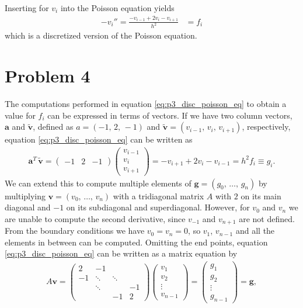 \documentclass[english,notitlepage,nofootinbib]{revtex4-1}  %
\begin{document}
Inserting for $v_i$ into the Poisson equation yields 
\begin{align}
    -v_i'' = \frac{-v_{i-1}+2v_i-v_{i+1}}{h^2} &= f_i \label{eq:p3_disc_poisson_eq} 
\end{align}
which is a discretized version of the Poisson equation. 



\section*{Problem 4}
The computations performed in equation \eqref{eq:p3_disc_poisson_eq} to obtain a value for $f_i$ can be expressed in terms of vectors. If we have two column vectors, $\mathbf{a}$ and $\mathbf{\tilde{v}}$, defined as $a=(-1,\,2,\,-1)$ and $\mathbf{\tilde{v}}=(v_{i-1},\,v_i,\,v_{i+1})$, respectively, equation \eqref{eq:p3_disc_poisson_eq} can be written as  
\begin{align*}
    \mathbf{a}^T \, \mathbf{\tilde{v}} = \begin{pmatrix}
        -1 & 2 & -1 
    \end{pmatrix}
    \begin{pmatrix}
        v_{i-1} \\ 
        v_i \\ 
        v_{i+1}
    \end{pmatrix}
    = -v_{i+1}+2v_i-v_{i-1} = h^2 f_i \equiv g_i.
\end{align*}
We can extend this to compute multiple elements of $\mathbf{g}=(g_0,\,\dots,\,g_n)$ by multiplying $\mathbf{v}=(v_0,\,\dots,\,v_n)$ with a tridiagonal matrix $A$ with $2$ on its main diagonal and $-1$ on its subdiagonal and superdiagonal. However, for $v_0$ and $v_n$ we are unable to compute the second derivative, since $v_{-1}$ and $v_{n+1}$ are not defined. From the boundary conditions we have $v_0=v_n=0$, so $v_1$, $v_{n-1}$ and all the elements in between can be computed. Omitting the end points, equation \eqref{eq:p3_disc_poisson_eq} can be written as a matrix equation by  
\begin{align*}
    A\mathbf{v} = 
    \begin{pmatrix}
        2 & -1 & & \\
        -1 & \ddots & \ddots & \\ 
         & \ddots & & -1 \\
          & & -1 & 2
    \end{pmatrix}
    \begin{pmatrix}
        v_1 \\
        v_2 \\
        \vdots \\ 
        v_{n-1}
    \end{pmatrix} = 
    \begin{pmatrix}
        g_1 \\
        g_2 \\ 
        \vdots \\
        g_{n-1}
    \end{pmatrix}
    = \mathbf{g},
\end{align*}
\end{document}
